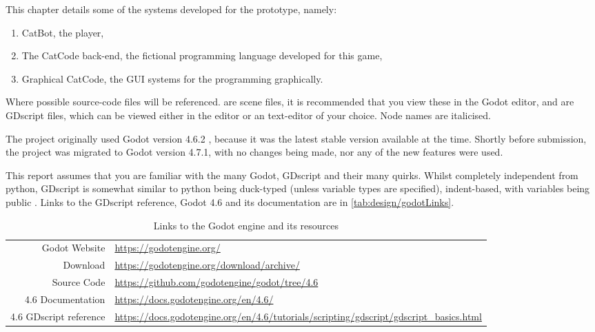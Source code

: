 
This chapter details some of the systems developed for the prototype, namely:

\begin{enumerate}
    \item CatBot, the player,
    \item The CatCode back-end, the fictional programming language developed for this game,
    \item Graphical CatCode, the GUI systems for the programming graphically.
\end{enumerate}

Where possible source-code files will be referenced.  are scene files, it is recommended that you view these in the Godot editor, and  are GDscript files, which can be viewed either in the editor or an text-editor of your choice. Node names are italicised. 

The project originally used Godot version 4.6.2 \citep{Godot4.6}, because it was the latest stable version available at the time. Shortly before submission, the project was migrated to Godot version 4.7.1, with no changes being made, nor any of the new features were used.

This report assumes that you are familiar with the many Godot, GDscript and their many quirks. Whilst completely independent from python, GDscript is somewhat similar to python being duck-typed (unless variable types are specified), indent-based, with variables being public \citep{GDscriptReference}. Links to the GDscript reference, Godot 4.6  and its documentation are in \autoref{tab:design/godotLinks}.

\begin{table}[]
    \centering
    \begin{tabular}{r|p{10.5cm}}
        Godot Website & \url{https://godotengine.org/} \\
        Download & \url{https://godotengine.org/download/archive/} \\
        Source Code & \url{https://github.com/godotengine/godot/tree/4.6} \\
        4.6 Documentation & \url{https://docs.godotengine.org/en/4.6/} \\
        4.6 GDscript reference & \url{https://docs.godotengine.org/en/4.6/tutorials/scripting/gdscript/gdscript_basics.html} \\
    \end{tabular}
    \caption{Links to the Godot engine and its resources}
    \label{tab:design/godotLinks}
\end{table}


